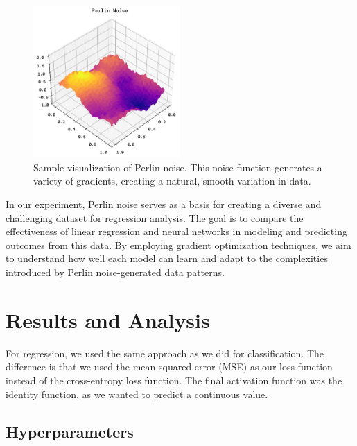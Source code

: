 \documentclass[twoside,11pt]{report}
\begin{document}
    \begin{figure}[h]
        \begin{center}
            \includegraphics[width=0.5\textwidth]{../runsAndFigures/perlinNoise.png}
        \end{center}
        \caption{Sample visualization of Perlin noise. This noise function generates a variety of gradients, 
        creating a natural, smooth variation in data.}\label{fig:perlin}
    \end{figure}

    In our experiment, Perlin noise serves as a basis for creating a diverse and challenging dataset for 
    regression analysis. The goal is to compare the effectiveness of linear regression and neural networks in
    modeling and predicting outcomes from this data. By employing gradient optimization techniques, we aim to
    understand how well each model can learn and adapt to the complexities introduced by Perlin noise-generated
    data patterns.

\newpage
\section*{Results and Analysis}
\label{sec:resultsdiscussion2}


    For regression, we used the same approach as we did for classification. The difference is that we used
    the mean squared error (MSE) as our loss function instead of the cross-entropy loss function. The final 
    activation function was the identity function, as we wanted to predict a continuous value.




\subsection*{Hyperparameters}
\label{sec:hyperparameters2}
\end{document}
